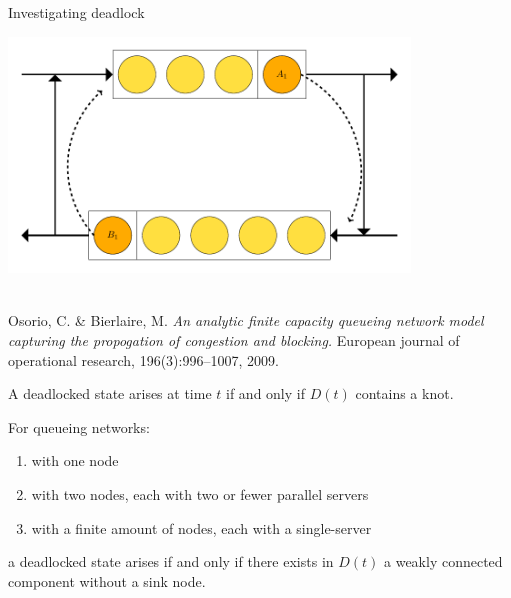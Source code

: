 \documentclass[xcolor={table}]{beamer}
\begin{document}
\begin{frame}{Investigating deadlock}
\begin{center}

\end{center}
\end{frame}

\begin{frame}
\begin{center}
\includegraphics[width=0.8\textwidth]{../images/2nodesindeadlock.pdf}
\end{center}
\end{frame}

\begin{frame}
\begin{center}
\\
\vspace{20mm}
\footnotesize{Osorio, C. \& Bierlaire, M. \textit{An analytic finite capacity queueing network model capturing the propogation of congestion and blocking.} European journal of operational research, 196(3):996–1007, 2009.}
\end{center}
\end{frame}

\begin{frame}
\begin{center}

\end{center}
\end{frame}

\begin{frame}
\begin{theorem}\label{thrm:knot}
A deadlocked state arises at time $t$ if and only if $D(t)$ contains a knot.
\end{theorem}

\begin{theorem}
For queueing networks:
\begin{enumerate}
  \item with one node
  \item with two nodes, each with two or fewer parallel servers
  \item with a finite amount of nodes, each with a single-server
\end{enumerate}
a deadlocked state arises if and only if there exists in $D(t)$ a
weakly connected component without a sink node.
\end{theorem}

\end{frame}
\end{document}
